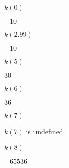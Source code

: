 \begin{exercises}
\begin{problem}
\begin{multicols}{4}
\begin{subproblem}
		$k(0)$
		\begin{shortsolution}
			$-10$ 
		\end{shortsolution}
	\end{subproblem}
	\begin{subproblem}
		$k(2.99)$
		\begin{shortsolution}
			$-10$ 
		\end{shortsolution}
	\end{subproblem}
	\begin{subproblem}
		$k(5)$
		\begin{shortsolution}
			$30$ 
		\end{shortsolution}
	\end{subproblem}
	\begin{subproblem}
		$k(6)$
		\begin{shortsolution}
			$36$ 
		\end{shortsolution}
	\end{subproblem}
	\begin{subproblem}
		$k(7)$
		\begin{shortsolution}
			$k(7)$ is undefined. 
		\end{shortsolution}
	\end{subproblem}
	\begin{subproblem}
		$k(8)$
		\begin{shortsolution}
			$-65536$ 
		\end{shortsolution}
	\end{subproblem}
\end{multicols}
\end{problem}
			

\end{exercises}
